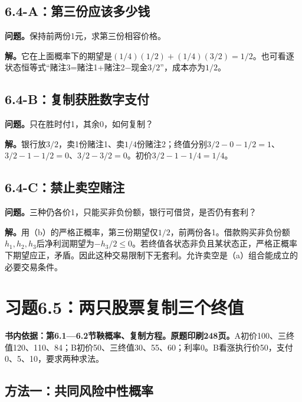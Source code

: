 \documentclass[11pt,a4paper,UTF8,fontset=fandol]{ctexart}
\begin{document}
\subsection{6.4-A：第三份应该多少钱}\label{aux7b2cux4e09ux4efdux5e94ux8be5ux591aux5c11ux94b1}

\textbf{问题。}保持前两份1元，求第三份相容价格。

\textbf{解。}它在上面概率下的期望是\((1/4)(1/2)+(1/4)(3/2)=\boxed{1/2}\)。也可看逐状态恒等式``赌注3=赌注1+赌注2−现金\(3/2\)''，成本亦为\(1/2\)。

\subsection{6.4-B：复制获胜数字支付}\label{bux590dux5236ux83b7ux80dcux6570ux5b57ux652fux4ed8}

\textbf{问题。}只在胜时付1，其余0，如何复制？

\textbf{解。}银行放\(3/2\)，卖1份赌注1、卖\(1/4\)份赌注2；终值分别\(3/2-0-1/2=1\)、\(3/2-1-1/2=0\)、\(3/2-3/2=0\)。初价\(3/2-1-1/4=\boxed{1/4}\)。

\subsection{6.4-C：禁止卖空赌注}\label{cux7981ux6b62ux5356ux7a7aux8d4cux6ce8}

\textbf{问题。}三种仍各价1，只能买非负份额，银行可借贷，是否仍有套利？

\textbf{解。}用（b）的严格正概率，第三份期望仅\(1/2\)，前两份各1。借款购买非负份额\(h_1,h_2,h_3\)后净利润期望为\(-h_3/2\le0\)。若终值各状态非负且某状态正，严格正概率下期望应正，矛盾。因此这种交易限制下无套利。允许卖空是（a）组合能成立的必要交易条件。

\bigskip

\section{习题6.5：两只股票复制三个终值}\label{ux4e60ux98986.5ux4e24ux53eaux80a1ux7968ux590dux5236ux4e09ux4e2aux7ec8ux503c}

\textbf{书内依据：第6.1---6.2节鞅概率、复制方程。原题印刷248页。}A初价100、三终值120、110、84；B初价50、三终值30、55、60；利率0。B看涨执行价50，支付0、5、10，要求两种求法。

\subsection{方法一：共同风险中性概率}\label{ux65b9ux6cd5ux4e00ux5171ux540cux98ceux9669ux4e2dux6027ux6982ux7387}
\end{document}
